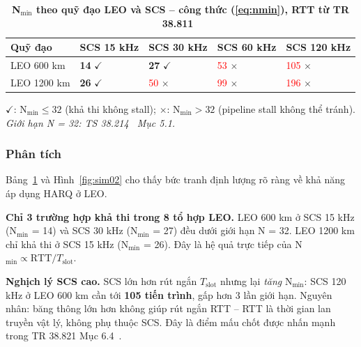 \begin{table}[H]
    \centering
    \caption[Bảng N$_{\min}$ -- quỹ đạo LEO]{\bfseries\fontsize{12pt}{0pt}\selectfont
    N$_{\min}$ theo quỹ đạo LEO và SCS -- công thức (\ref{eq:nmin}), RTT từ TR 38.811~\cite{tr38811}}
    \label{tab:nmin_full}
    \begin{tabularx}{0.92\textwidth}{
    | >{\centering\arraybackslash}X
    | >{\centering\arraybackslash}X
    | >{\centering\arraybackslash}X
    | >{\centering\arraybackslash}X
    | >{\centering\arraybackslash}X |}
    \hline
    \bfseries Quỹ đạo & \bfseries SCS 15 kHz & \bfseries SCS 30 kHz & \bfseries SCS 60 kHz & \bfseries SCS 120 kHz \\\hline
    LEO 600 km  & \textbf{14} $\checkmark$ & \textbf{27} $\checkmark$ & \textcolor{red}{53} $\times$ & \textcolor{red}{105} $\times$ \\\hline
    LEO 1200 km & \textbf{26} $\checkmark$ & \textcolor{red}{50} $\times$ & \textcolor{red}{99} $\times$ & \textcolor{red}{196} $\times$ \\\hline
    \end{tabularx}
    \begin{flushleft}
    \small $\checkmark$: N$_{\min} \leq 32$ (khả thi không stall); $\times$: N$_{\min} > 32$ (pipeline stall không thể tránh).\\
    \textit{Giới hạn N = 32: TS 38.214~\cite{ts38214} Mục 5.1.}
    \end{flushleft}
\end{table}

\subsubsection{Phân tích}

Bảng~\ref{tab:nmin_full} và Hình~\ref{fig:sim02} cho thấy bức tranh định lượng rõ ràng về khả năng áp dụng HARQ ở LEO.

\textbf{Chỉ 3 trường hợp khả thi trong 8 tổ hợp LEO.} LEO 600 km ở SCS 15 kHz (N$_{\min}$ = 14) và SCS 30 kHz (N$_{\min}$ = 27) đều dưới giới hạn N = 32. LEO 1200 km chỉ khả thi ở SCS 15 kHz (N$_{\min}$ = 26). Đây là hệ quả trực tiếp của N$_{\min} \propto \text{RTT}/T_{\text{slot}}$.

\textbf{Nghịch lý SCS cao.} SCS lớn hơn rút ngắn $T_{\text{slot}}$ nhưng lại \textit{tăng} N$_{\min}$: SCS 120 kHz ở LEO 600 km cần tới \textbf{105 tiến trình}, gấp hơn 3 lần giới hạn. Nguyên nhân: băng thông lớn hơn không giúp rút ngắn RTT -- RTT là thời gian lan truyền vật lý, không phụ thuộc SCS. Đây là điểm mấu chốt được nhấn mạnh trong TR 38.821 Mục 6.4~\cite{tr38821}.

